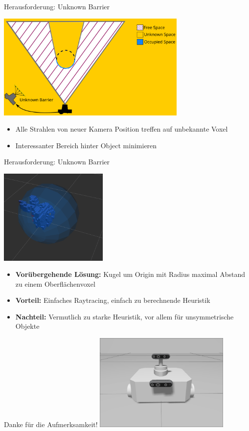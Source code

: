 \documentclass{beamer}
\begin{document}
\begin{frame}{Herausforderung: Unknown Barrier}
	\begin{block}{}
		\begin{center}
			\includegraphics[width=0.7\textwidth]{Graphics/unknown_barrier_vscott_2.png}
		\end{center}
		\begin{itemize}
			\item Alle Strahlen von neuer Kamera Position treffen auf unbekannte Voxel
			\item Interessanter Bereich hinter Object minimieren
		\end{itemize}
	\end{block}
\end{frame}
\begin{frame}{Herausforderung: Unknown Barrier}
	\begin{block}{}
		\begin{center}
			\includegraphics[width=0.4\textwidth]{Graphics/sphere.png}
		\end{center}
		\begin{itemize}
			\item \textbf{Vorübergehende Lösung:} Kugel um Origin mit Radius maximal Abstand zu einem Oberflächenvoxel
			\item \textbf{Vorteil:} Einfaches Raytracing, einfach zu berechnende Heuristik
			\item \textbf{Nachteil:} Vermutlich zu starke Heuristik, vor allem für unsymmetrische Objekte
		\end{itemize}
	\end{block}
\end{frame}
\begin{frame}{}
	\centering
	\Large{Danke für die Aufmerksamkeit!}
	\vfill
	\includegraphics[width=0.5\textwidth]{Graphics/tb.png}
\end{frame}

\printbibliography
\end{document}
